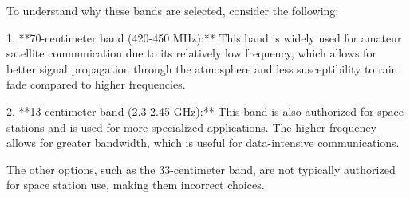 To understand why these bands are selected, consider the following:

1. **70-centimeter band (420-450 MHz):** This band is widely used for amateur satellite communication due to its relatively low frequency, which allows for better signal propagation through the atmosphere and less susceptibility to rain fade compared to higher frequencies.

2. **13-centimeter band (2.3-2.45 GHz):** This band is also authorized for space stations and is used for more specialized applications. The higher frequency allows for greater bandwidth, which is useful for data-intensive communications.

The other options, such as the 33-centimeter band, are not typically authorized for space station use, making them incorrect choices.

